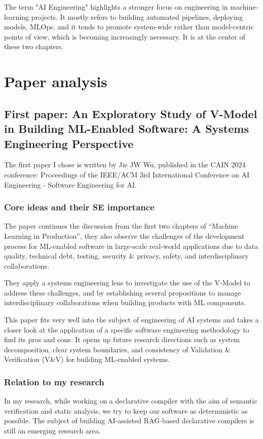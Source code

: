 \documentclass[11pt]{article}
\begin{document}
The term "AI Engineering" highlights a stronger focus on engineering in
machine-learning projects. It mostly refers to building automated pipelines,
deploying models, MLOps, and it tends to promote system-wide rather than
model-centric points of view, which is becoming increasingly necessary. It is at
the center of these two chapters.
\section{Paper analysis}
\label{sec:org8d4bc6c}
\subsection{First paper: An Exploratory Study of V-Model in Building ML-Enabled Software: A Systems Engineering Perspective}
\label{sec:org41a72e7}
The first paper I chose is written by Jie JW Wu, published in the CAIN 2024
conference: Proceedings of the IEEE/ACM 3rd International Conference on AI
Engineering - Software Engineering for AI.
\subsubsection{Core ideas and their SE importance}
\label{sec:orgd2f0109}
The paper continues the discussion from the first two chapters of “Machine
Learning in Production”, they also observe the challenges of the development
process for ML-enabled software in large-scale real-world applications due to
data quality, technical debt, testing, security \& privacy, safety, and
interdisciplinary collaborations.

They apply a systems engineering lens to investigate the use of the V-Model to
address these challenges, and by establishing several propositions to manage
interdisciplinary collaborations when building products with ML components.

This paper fits very well into the subject of engineering of AI systems and
takes a closer look at the application of a specific software engineering
methodology to find its pros and cons. It opens up future research directions
such as system decomposition, clear system boundaries, and consistency of
Validation \& Verification (V\&V) for building ML-enabled systems.
\subsubsection{Relation to my research}
\label{sec:org26e6a4e}
In my research, while working on a declarative compiler with the aim of semantic
verification and static analysis, we try to keep our software as deterministic
as possible. The subject of building AI-assisted RAG-based declarative compilers
is still an emerging research area.
\end{document}
